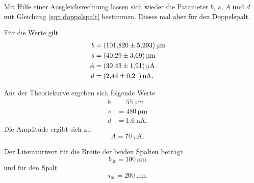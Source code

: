 \noindent Mit Hilfe einer Ausgleichsrechnung lassen sich wieder die Parameter $b$, $s$, $A$ und $d$ mit Gleichung \eqref{eqn:doppelspalt} bestimmen. Dieses mal aber für den Doppelspalt. 

\noindent Für die Werte gilt
\begin{align*}
    b &= \SI{101.820 \pm 5.293}{\micro\meter} \\
    s &= \SI{40.29 \pm 3.69}{\micro\meter} \\
    A &= \SI{39.43 \pm 1.91}{\micro\ampere} \\
    d &= \SI{2.44(21)}{\nano\ampere}. 
\end{align*}

\noindent Aus der Theoriekurve ergeben sich folgende Werte
\begin{align*}
    b &= \SI{55}{\micro\meter} \\
    s &= \SI{480}{\micro\meter} \\
    d &= \SI{1.6}{\nano\ampere}.
\end{align*}
Die Amplitude ergibt sich zu 
\begin{equation*}
    A = \SI{70}{\micro\ampere}. %
\end{equation*}

\noindent Der Literaturwert für die Breite der beiden Spalten beträgt
\begin{equation*}
    b_{\text{lit}} = \SI{100}{\micro\meter}
\end{equation*}
und für den Spalt 
\begin{equation*}
    s_{\text{lit}} = \SI{200}{\micro\meter}.
\end{equation*}
